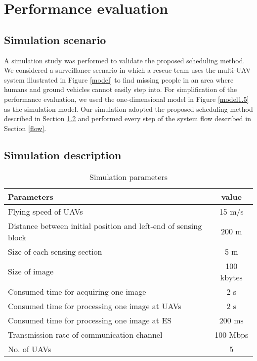 \documentclass[journal]{IEEEtran}
\begin{document}
\section{Performance evaluation}\label{eva}

\subsection{Simulation scenario}
A simulation study was performed to validate the proposed scheduling method.
%
We considered a surveillance scenario in which a rescue team uses the multi-UAV system illustrated in Figure \ref{model} to find missing people in an area where humans and ground vehicles cannot easily step into.
%
For simplification of the performance evaluation, we used the one-dimensional model in Figure \ref{model1.5} as the simulation model.
%
Our simulation adopted the proposed scheduling method described in Section \ref{} and performed every step of the system flow described in Section \ref{flow}.
%

\subsection{Simulation description}

\begin{table}[t]
\centering
\caption{Simulation parameters}
  \begin{tabular}{|p{5cm}||c|} \hline
Parameters & value \\ \hline
Flying speed of UAVs & 15 m/s \\ \hline
Distance between initial position and left-end of sensing block & 200 m  \\ \hline
Size of each sensing section & 5 m  \\ \hline
Size of image  &  100 kbytes \\ \hline
Consumed time for acquiring one image & 2 s \\ \hline
Consumed time for processing one image at UAVs &  2 s \\ \hline
Consumed time for processing one image at ES &  200 ms \\ \hline
Transmission rate of communication channel & 100 Mbps \\ \hline
No. of UAVs & 5\\ \hline
\end{tabular}
\label{para_val}
\end{table}
\end{document}

